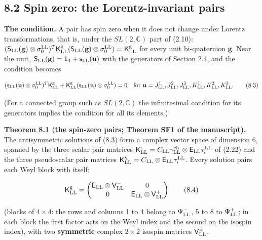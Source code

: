 \documentclass[
  10pt,
]{article}
\begin{document}
\hypertarget{spin-zero-the-lorentz-invariant-pairs}{%
\subsection{8.2 Spin zero: the Lorentz-invariant
pairs}\label{spin-zero-the-lorentz-invariant-pairs}}

\textbf{The condition.} A pair has spin zero when it does not change
under Lorentz transformations, that is, under the \(SL(2,\mathbb C)\)
part of (2.10):
\((\mathsf S_{\rm LL}(\mathbf g)\otimes\sigma^{\rm LL}_0)^T\mathsf K^{\rm g}_{\rm LL}(\mathsf S_{\rm LL}(\mathbf g)\otimes\sigma^{\rm LL}_0)=\mathsf K^{\rm g}_{\rm LL}\)
for every unit bi-quaternion \(\mathbf g\). Near the unit,
\(\mathsf S_{\rm LL}(\mathbf g)=\mathsf 1_4+\mathsf s_{\rm LL}(\mathbf u)\)
with the generators of Section 2.4, and the condition becomes

\[(\mathsf s_{\rm LL}(\mathbf u)\otimes\sigma^{\rm LL}_0)^T\mathsf K^{\rm g}_{\rm LL}+\mathsf K^{\rm g}_{\rm LL}(\mathsf s_{\rm LL}(\mathbf u)\otimes\sigma^{\rm LL}_0)=0\quad\text{for }\mathbf u=J^1_{\rm LL},J^2_{\rm LL},J^3_{\rm LL},K^1_{\rm LL},K^2_{\rm LL},K^3_{\rm LL}.\tag{8.3}\]

(For a connected group such as \(SL(2,\mathbb C)\) the infinitesimal
condition for its generators implies the condition for all its
elements.)

\textbf{Theorem 8.1 (the spin-zero pairs; Theorem SF1 of the
manuscript).} The antisymmetric solutions of (8.3) form a complex vector
space of dimension 6, spanned by the three scalar pair matrices
\(\mathsf K^\iota_{\rm LL}=C_{\rm LL}\gamma^{\rm ch}_{\rm LL}\otimes\mathsf E_{\rm LL}\tau^{\rm LL}_\iota\)
of (2.22) and the three pseudoscalar pair matrices
\(\mathsf K'^\iota_{\rm LL}=C_{\rm LL}\otimes\mathsf E_{\rm LL}\tau^{\rm LL}_\iota\).
Every solution pairs each Weyl block with itself:

\[\mathsf K^{\rm g}_{\rm LL}=\begin{pmatrix}\mathsf E_{\rm LL}\otimes\mathsf V^-_{\rm LL}&0\\0&\mathsf E_{\rm LL}\otimes\mathsf V^+_{\rm LL}\end{pmatrix}\tag{8.4}\]

(blocks of \(4\times4\): the rows and columns 1 to 4 belong to
\(\Psi^-_{\rm LL}\), 5 to 8 to \(\Psi^+_{\rm LL}\); in each block the
first factor acts on the Weyl index and the second on the isospin
index), with two \textbf{symmetric} complex \(2\times2\) isospin
matrices \(\mathsf V^\pm_{\rm LL}\).
\end{document}
